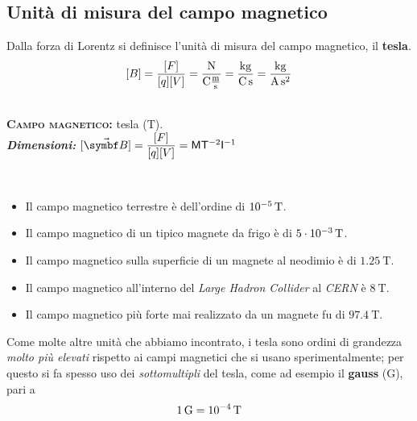 \subsection{Unità di misura del campo magnetico}
Dalla forza di Lorentz si definisce l'unità di misura del campo magnetico, il \textbf{tesla}.
\begin{equation*}
	\left[B\right]=\frac{[F]}{[q][V]}=\frac{\unit[per-mode = fraction]{\newton}}{\unit{\coulomb}\unit[per-mode = fraction]{ \meter\per\second}}=\unit[per-mode = fraction]{\kilogram\per\coulomb\per\second} = \unit[per-mode = fraction]{\kilogram\per\ampere\per\second\squared}
\end{equation*}
\begin{units}~\\
	\textbf{\textsc{Campo magnetico:}} tesla ($\unit{\tesla}$).\\
	\textit{\textbf{Dimensioni:}} $[\vba{B}]=\dfrac{[F]}{[q][V]}=\mathsf{M} \mathsf{T}^{-2}  \mathsf{I}^{-1}$
\end{units}
	\begin{examples}~
		\begin{itemize}
			\item Il campo magnetico terrestre è dell'ordine di $\SI[exponent-product=\ensuremath{\cdot}]{d-5}{\tesla}$.
			\item Il campo magnetico di un tipico magnete da frigo è di $\SI[exponent-product=\ensuremath{\cdot}]{5d-3}{\tesla}$.
			\item Il campo magnetico sulla superficie di un magnete al neodimio è di $\SI[exponent-product=\ensuremath{\cdot}]{1.25}{\tesla}$.
			\item Il campo magnetico all'interno del \textit{Large Hadron Collider} al \textit{CERN} è $\SI[exponent-product=\ensuremath{\cdot}]{8}{\tesla}$.
			\item Il campo magnetico più forte mai realizzato da un magnete fu di  $\SI[exponent-product=\ensuremath{\cdot}]{97.4}{\tesla}$.
		\end{itemize}
	\end{examples}
Come molte altre unità che abbiamo incontrato, i tesla sono ordini di grandezza \textit{molto più elevati} rispetto ai campi magnetici che si usano sperimentalmente; per questo si fa spesso uso dei \textit{sottomultipli} del tesla, come ad esempio il \textbf{gauss} ($\text{G}$), pari a
\begin{equation}
	\SI[exponent-product=\ensuremath{\cdot}]{1}{\text{G}}=\SI[exponent-product=\ensuremath{\cdot}]{d-4}{\tesla}
\end{equation}
